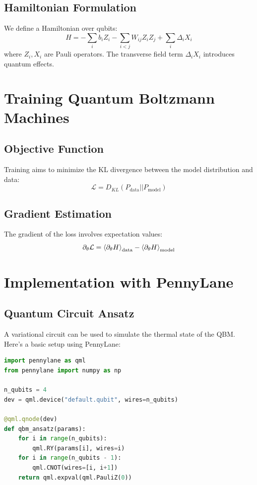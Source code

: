 \documentclass[12pt]{article}
\begin{document}
\subsection{Hamiltonian Formulation}

We define a Hamiltonian over qubits:
\[
H = -\sum_i b_i Z_i - \sum_{i<j} W_{ij} Z_i Z_j + \sum_i \Delta_i X_i
\]
where \( Z_i, X_i \) are Pauli operators. The transverse field term \( \Delta_i X_i \) introduces quantum effects.

\section{Training Quantum Boltzmann Machines}

\subsection{Objective Function}

Training aims to minimize the KL divergence between the model distribution and data:
\[
\mathcal{L} = D_{KL}(P_{\text{data}} || P_{\text{model}})
\]

\subsection{Gradient Estimation}

The gradient of the loss involves expectation values:
\[
\partial_\theta \mathcal{L} = \expval{\partial_\theta H}_{\text{data}} - \expval{\partial_\theta H}_{\text{model}}
\]

\section{Implementation with PennyLane}

\subsection{Quantum Circuit Ansatz}

A variational circuit can be used to simulate the thermal state of the QBM. Here's a basic setup using PennyLane:

\begin{lstlisting}[language=Python]
import pennylane as qml
from pennylane import numpy as np

n_qubits = 4
dev = qml.device("default.qubit", wires=n_qubits)

@qml.qnode(dev)
def qbm_ansatz(params):
    for i in range(n_qubits):
        qml.RY(params[i], wires=i)
    for i in range(n_qubits - 1):
        qml.CNOT(wires=[i, i+1])
    return qml.expval(qml.PauliZ(0))
\end{lstlisting}
\end{document}
